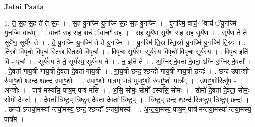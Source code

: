 \documentclass[17pt]{extarticle}
\begin{document}
\textbf{Jatai Paata} \newline

1. ते॒ स॒ह स॒ह ते॑ ते स॒ह । . स॒ह यु॒नज्मि॑ यु॒नज्मि॑ स॒ह स॒ह यु॒नज्मि॑ । . यु॒नज्मि॒ वाचं॒ ॅवाचं॑ ॅयु॒नज्मि॑ यु॒नज्मि॒ वाच᳚म् । . वाचꣳ॑ स॒ह स॒ह वाचं॒ ॅवाचꣳ॑ स॒ह । . स॒ह सूर्ये॑ण॒ सूर्ये॑ण स॒ह स॒ह सूर्ये॑ण । . सूर्ये॑ण ते ते॒ सूर्ये॑ण॒ सूर्ये॑ण ते । . ते॒ यु॒नज्मि॑ यु॒नज्मि॑ ते ते यु॒नज्मि॑ । . यु॒नज्मि॑ ति॒स्र स्ति॒स्रो यु॒नज्मि॑ यु॒नज्मि॑ ति॒स्रः । . ति॒स्रो वि॒पृचो॑ वि॒पृच॑ स्ति॒स्र स्ति॒स्रो वि॒पृचः॑ । . वि॒पृचः॒ सूर्य॑स्य॒ सूर्य॑स्य वि॒पृचो॑ वि॒पृचः॒ सूर्य॑स्य । . वि॒पृच॒ इति॑ वि - पृचः॑ । . सूर्य॑स्य ते ते॒ सूर्य॑स्य॒ सूर्य॑स्य ते । . त॒ इति॑ ते । . अ॒ग्निर् दे॒वता॑ दे॒वता॒ ऽग्नि र॒ग्निर् दे॒वता᳚ । . दे॒वता॑ गाय॒त्री गा॑य॒त्री दे॒वता॑ दे॒वता॑ गाय॒त्री । . गा॒य॒त्री छन्द॒ श्छन्दो॑ गाय॒त्री गा॑य॒त्री छन्दः॑ । . छन्द॑ उपाꣳ॒॒शो रु॑पाꣳ॒॒शो श्छन्द॒ श्छन्द॑ उपाꣳ॒॒शोः । . उ॒पाꣳ॒॒शोः पात्र॒म् पात्र॑ मुपाꣳ॒॒शो रु॑पाꣳ॒॒शोः पात्र᳚म् । . उ॒पाꣳ॒॒शोरित्यु॑प - अꣳ॒॒शोः । . पात्र॑ मस्यसि॒ पात्र॒म् पात्र॑ मसि । . अ॒सि॒ सोमः॒ सोमो᳚ ऽस्यसि॒ सोमः॑ । . सोमो॑ दे॒वता॑ दे॒वता॒ सोमः॒ सोमो॑ दे॒वता᳚ । . दे॒वता᳚ त्रि॒ष्टुप् त्रि॒ष्टुब् दे॒वता॑ दे॒वता᳚ त्रि॒ष्टुप् । . त्रि॒ष्टुप् छन्द॒ श्छन्द॑ स्त्रि॒ष्टुप् त्रि॒ष्टुप् छन्दः॑ । . छन्दो᳚ ऽन्तर्या॒मस्या᳚ न्तर्या॒मस्य॒ छन्द॒ श्छन्दो᳚ ऽन्तर्या॒मस्य॑ । . अ॒न्त॒र्या॒मस्य॒ पात्र॒म् पात्र॑ मन्तर्या॒मस्या᳚ न्तर्या॒मस्य॒ पात्र᳚म् । \newline
\end{document}
